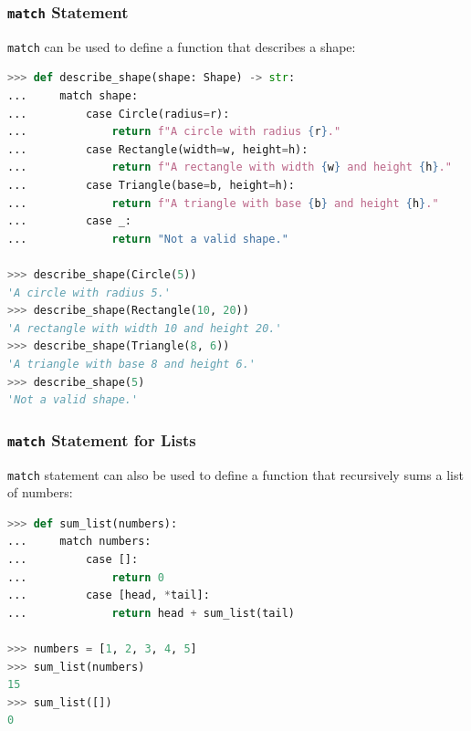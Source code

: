 \documentclass[envcountsect,10pt]{beamer}
\begin{document}
\begin{frame}[fragile]
    \frametitle{\texttt{match} Statement}

    \texttt{match} can be used to define a function that describes a shape:

    \begin{lstlisting}[language=Python]
>>> def describe_shape(shape: Shape) -> str:
...     match shape:
...         case Circle(radius=r):
...             return f"A circle with radius {r}."
...         case Rectangle(width=w, height=h):
...             return f"A rectangle with width {w} and height {h}."
...         case Triangle(base=b, height=h):
...             return f"A triangle with base {b} and height {h}."
...         case _:
...             return "Not a valid shape."

>>> describe_shape(Circle(5))
'A circle with radius 5.'
>>> describe_shape(Rectangle(10, 20))
'A rectangle with width 10 and height 20.'
>>> describe_shape(Triangle(8, 6))
'A triangle with base 8 and height 6.'
>>> describe_shape(5)
'Not a valid shape.'
    \end{lstlisting}

\end{frame}

\begin{frame}[fragile]
    \frametitle{\texttt{match} Statement for Lists}

    \texttt{match} statement can also be used to define a function that recursively sums a list of numbers:

    \begin{lstlisting}[language=Python]
>>> def sum_list(numbers):
...     match numbers:
...         case []:
...             return 0
...         case [head, *tail]:
...             return head + sum_list(tail)

>>> numbers = [1, 2, 3, 4, 5]
>>> sum_list(numbers)
15
>>> sum_list([])
0
    \end{lstlisting}

\end{frame}
\end{document}
